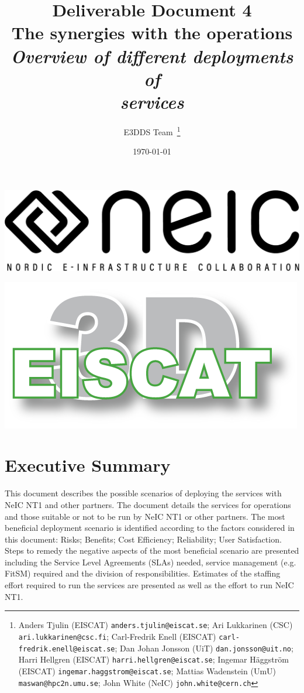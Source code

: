 \documentclass[12pt,a4paper]{article}
\title{
{\bf Deliverable Document 4} \\
The synergies with the \nnt operations\\
{\it Overview of different deployments of\\ \ED \einfra services}}
\author{E3DDS Team~\footnote{
Anders Tjulin (EISCAT) {\tt anders.tjulin@eiscat.se};
Ari Lukkarinen (CSC) {\tt ari.lukkarinen@csc.fi};
Carl-Fredrik Enell (EISCAT) {\tt carl-fredrik.enell@eiscat.se};
Dan Johan Jonsson (UiT) {\tt dan.jonsson@uit.no};
Harri Hellgren (EISCAT) {\tt harri.hellgren@eiscat.se};
Ingemar H\"{a}ggstr\"{o}m (EISCAT) {\tt ingemar.haggstrom@eiscat.se};
Mattias Wadenstein (UmU) {\tt maswan@hpc2n.umu.se};
John White (NeIC) {\tt john.white@cern.ch}}}
\date{\today}
\newcommand{\nnt}{NeIC NT1\xspace}
\begin{document}
\pagestyle{fancy}

\maketitle
\par\noindent
\begin{minipage}{0.5\textwidth}
  \includegraphics[scale=0.18]{NEIC_logo_screen_black.pdf}
\end{minipage}
\begin{minipage}{0.5\textwidth}
  \hfill
  \includegraphics[width=0.75\linewidth]{e3d-logo-green-500px}
\end{minipage}

\newpage
\tableofcontents
\newpage

\section{Executive Summary}
\label{exec-summ}


This document describes the possible scenarios of deploying the \ED \einfra services with \nnt and other partners.
The document details the services for \ED operations and those suitable or not to be run by \nnt or other partners.
The most beneficial deployment scenario is identified according to the factors considered in this document: Risks; Benefits; Cost Efficiency; Reliability; User Satisfaction.
Steps to remedy the negative aspects of the most beneficial scenario are presented including the Service Level Agreements (SLAs) needed, service management (e.g. FitSM) required and the division of responsibilities.  
Estimates of the staffing effort required to run the \ED services are presented as well as the effort to run \nnt. 
\end{document}
